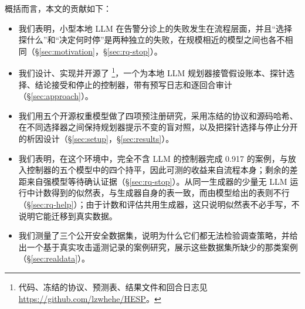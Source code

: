 概括而言，本文的贡献如下：
\begin{itemize}
  \item 我们表明，小型本地 LLM 在告警分诊上的失败发生在流程层面，并且“选择探什么”和“决定何时停”是两种独立的失败，在规模相近的模型之间也各不相同（\S\ref{sec:motivation}，\S\ref{sec:rq-stop}）。
  \item 我们设计、实现并开源了 \hesp{}\footnote{代码、冻结的协议、预测表、结果文件和回合日志见 \url{https://github.com/lzwhehe/HESP}。}，一个为本地 LLM 规划器接管假设账本、探针选择、结论接受和停止的控制器，带有预写日志和逐回合审计（\S\ref{sec:approach}）。
  \item 我们用五个开源权重模型做了四项预注册研究，采用冻结的协议和源码哈希、在不同选择器之间保持规划器提示不变的盲对照，以及把探针选择与停止分开的析因设计（\S\ref{sec:setup}，\S\ref{sec:results}）。
  \item 我们表明，在这个环境中，完全不含 LLM 的控制器完成 0.917 的案例，与放入控制器的五个模型中的四个持平，因此可测的收益来自流程本身；剩余的差距来自强模型等待确认证据（\S\ref{sec:rq-stop}）。从同一生成器的少量无 LLM 运行中计数得到的似然表，与生成器自身的表一致，而由模型给出的表则不行（\S\ref{sec:rq-help}）；由于计数和评估共用生成器，这只说明似然表不必手写，不说明它能迁移到真实数据。
  \item 我们测量了三个公开安全数据集，说明为什么它们都无法检验调查策略，并给出一个基于真实攻击遥测记录的案例研究，展示这些数据集所缺少的那类案例（\S\ref{sec:realdata}）。
\end{itemize}
